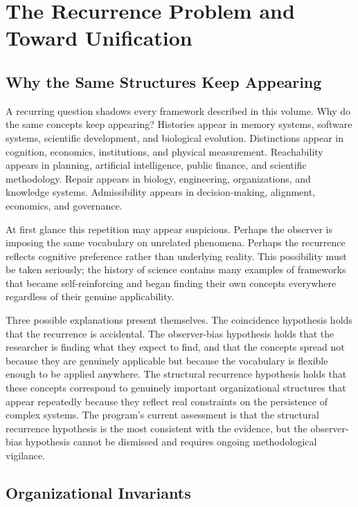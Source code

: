 \documentclass[11pt, oneside]{book}
\theoremstyle{definition}
\theoremstyle{remark}
\begin{document}
\chapter{The Recurrence Problem and Toward Unification}

\section{Why the Same Structures Keep Appearing}

A recurring question shadows every framework described in this volume. Why do the same concepts keep appearing? Histories appear in memory systems, software systems, scientific development, and biological evolution. Distinctions appear in cognition, economics, institutions, and physical measurement. Reachability appears in planning, artificial intelligence, public finance, and scientific methodology. Repair appears in biology, engineering, organizations, and knowledge systems. Admissibility appears in decision-making, alignment, economics, and governance.

At first glance this repetition may appear suspicious. Perhaps the observer is imposing the same vocabulary on unrelated phenomena. Perhaps the recurrence reflects cognitive preference rather than underlying reality. This possibility must be taken seriously; the history of science contains many examples of frameworks that became self-reinforcing and began finding their own concepts everywhere regardless of their genuine applicability.

Three possible explanations present themselves. The coincidence hypothesis holds that the recurrence is accidental. The observer-bias hypothesis holds that the researcher is finding what they expect to find, and that the concepts spread not because they are genuinely applicable but because the vocabulary is flexible enough to be applied anywhere. The structural recurrence hypothesis holds that these concepts correspond to genuinely important organizational structures that appear repeatedly because they reflect real constraints on the persistence of complex systems. The program's current assessment is that the structural recurrence hypothesis is the most consistent with the evidence, but the observer-bias hypothesis cannot be dismissed and requires ongoing methodological vigilance.

\section{Organizational Invariants}
\end{document}
